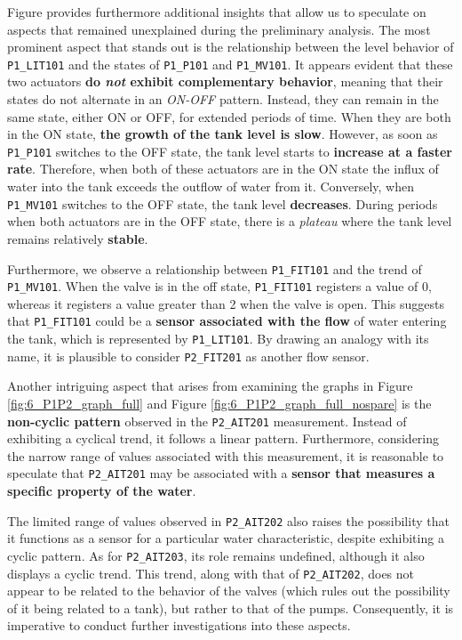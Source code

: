 Figure %
provides furthermore additional insights that allow us to speculate on aspects that remained unexplained during the preliminary analysis. The most prominent aspect that stands out is the relationship between the level behavior of \texttt{P1\_LIT101} and the states of \texttt{P1\_P101} and \texttt{P1\_MV101}. It appears evident that these two actuators \textbf{do \textit{not} exhibit complementary behavior}, meaning that their states do not alternate in an \textit{ON-OFF} pattern. Instead, they can remain in the same state, either ON or OFF, for extended periods of time. When they are both in the ON state, \textbf{the growth of the tank level is slow}. However, as soon as \texttt{P1\_P101} switches to the OFF state, the tank level starts to \textbf{increase at a faster rate}. Therefore, when both of these actuators are in the ON state the influx of water into the tank exceeds the outflow of water from it. Conversely, when \texttt{P1\_MV101} switches to the OFF state, the tank level \textbf{decreases}. During periods when both actuators are in the OFF state, there is a \textit{plateau} where the tank level remains relatively \textbf{stable}.

\bigskip
Furthermore, we observe a relationship between \texttt{P1\_FIT101} and the trend of \texttt{P1\_MV101}. When the valve is in the off state, \texttt{P1\_FIT101} registers a value of 0, whereas it registers a value greater than 2 when the valve is open. This suggests that \texttt{P1\_FIT101} could be a \textbf{sensor associated with the flow} of water entering the tank, which is represented by \texttt{P1\_LIT101}. By drawing an analogy with its name, it is plausible to consider \texttt{P2\_FIT201} as another flow sensor.

\bigskip
Another intriguing aspect that arises from examining the graphs in Figure \ref{fig:6_P1P2_graph_full} and Figure \ref{fig:6_P1P2_graph_full_nospare} is the \textbf{non-cyclic pattern} observed in the \texttt{P2\_AIT201} measurement. Instead of exhibiting a cyclical trend, it follows a linear pattern. Furthermore, considering the narrow range of values associated with this measurement, it is reasonable to speculate that \texttt{P2\_AIT201} may be associated with a \textbf{sensor that measures a specific property of the water}.

The limited range of values observed in \texttt{P2\_AIT202} also raises the possibility that it functions as a sensor for a particular water characteristic, despite exhibiting a cyclic pattern. As for \texttt{P2\_AIT203}, its role remains undefined, although it also displays a cyclic trend. This trend, along with that of \texttt{P2\_AIT202}, does not appear to be related to the behavior of the valves (which rules out the possibility of it being related to a tank), but rather to that of the pumps. Consequently, it is imperative to conduct further investigations into these aspects.

